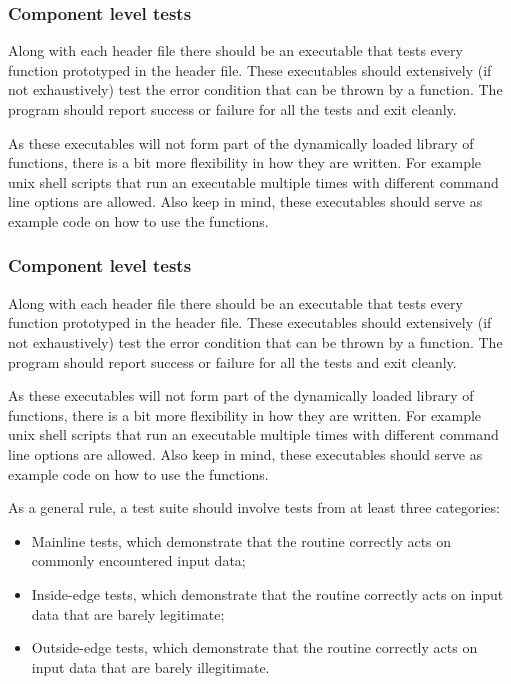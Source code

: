 \documentclass[]{ligodcc}
\begin{document}
\subsubsection{Component level tests}
Along with each header file there should be an executable that tests
every function prototyped in the header file.  These executables
should extensively (if not exhaustively) test the error condition that
can be thrown by a function. The program  should report success or
failure for all the tests and exit cleanly.

As these executables will not form part of the dynamically loaded
library of functions, there is a bit more flexibility in how they are
written.  For example unix shell scripts that run an executable
multiple times with different command line options are allowed. Also
keep in mind, these executables should serve as example code on  how
to use the functions.


\subsubsection{Component level tests}
Along with each header file there should be an executable that tests
every function prototyped in the header file.  These executables
should extensively (if not exhaustively) test the error condition that
can be thrown by a function. The program  should report success or
failure for all the tests and exit cleanly.

As these executables will not form part of the dynamically loaded
library of functions, there is a bit more flexibility in how they are
written.  For example unix shell scripts that run an executable
multiple times with different command line options are allowed. Also
keep in mind, these executables should serve as example code on  how
to use the functions.

As a general rule, a test suite should involve tests from at least
three categories:
\begin{itemize}
   \item
   Mainline tests, which demonstrate that the routine correctly
   acts on commonly encountered input data;
   \item
   Inside-edge tests, which demonstrate that the routine
   correctly acts on input data that are barely legitimate;
   \item
   Outside-edge tests, which demonstrate that the routine
   correctly acts on input data that are barely illegitimate.
\end{itemize}
\end{document}
